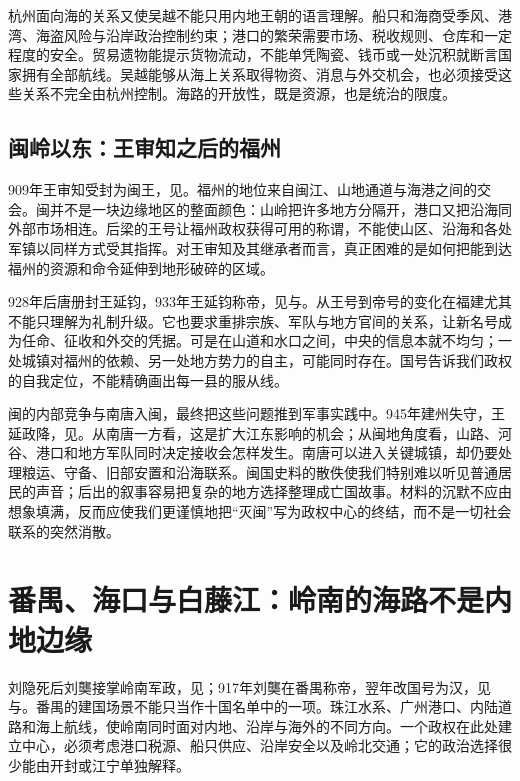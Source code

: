 杭州面向海的关系又使吴越不能只用内地王朝的语言理解。船只和海商受季风、港湾、海盗风险与沿岸政治控制约束；港口的繁荣需要市场、税收规则、仓库和一定程度的安全。贸易遗物能提示货物流动，不能单凭陶瓷、钱币或一处沉积就断言国家拥有全部航线。吴越能够从海上关系取得物资、消息与外交机会，也必须接受这些关系不完全由杭州控制。海路的开放性，既是资源，也是统治的限度。

\subsection{闽岭以东：王审知之后的福州}

909年王审知受封为闽王，见。福州的地位来自闽江、山地通道与海港之间的交会。闽并不是一块边缘地区的整面颜色：山岭把许多地方分隔开，港口又把沿海同外部市场相连。后梁的王号让福州政权获得可用的称谓，不能使山区、沿海和各处军镇以同样方式受其指挥。对王审知及其继承者而言，真正困难的是如何把能到达福州的资源和命令延伸到地形破碎的区域。

928年后唐册封王延钧，933年王延钧称帝，见与。从王号到帝号的变化在福建尤其不能只理解为礼制升级。它也要求重排宗族、军队与地方官间的关系，让新名号成为任命、征收和外交的凭据。可是在山道和水口之间，中央的信息本就不均匀；一处城镇对福州的依赖、另一处地方势力的自主，可能同时存在。国号告诉我们政权的自我定位，不能精确画出每一县的服从线。

闽的内部竞争与南唐入闽，最终把这些问题推到军事实践中。945年建州失守，王延政降，见。从南唐一方看，这是扩大江东影响的机会；从闽地角度看，山路、河谷、港口和地方军队同时决定接收会怎样发生。南唐可以进入关键城镇，却仍要处理粮运、守备、旧部安置和沿海联系。闽国史料的散佚使我们特别难以听见普通居民的声音；后出的叙事容易把复杂的地方选择整理成亡国故事。材料的沉默不应由想象填满，反而应使我们更谨慎地把“灭闽”写为政权中心的终结，而不是一切社会联系的突然消散。

\section{番禺、海口与白藤江：岭南的海路不是内地边缘}

刘隐死后刘龑接掌岭南军政，见；917年刘龑在番禺称帝，翌年改国号为汉，见与。番禺的建国场景不能只当作十国名单中的一项。珠江水系、广州港口、内陆道路和海上航线，使岭南同时面对内地、沿岸与海外的不同方向。一个政权在此处建立中心，必须考虑港口税源、船只供应、沿岸安全以及岭北交通；它的政治选择很少能由开封或江宁单独解释。

